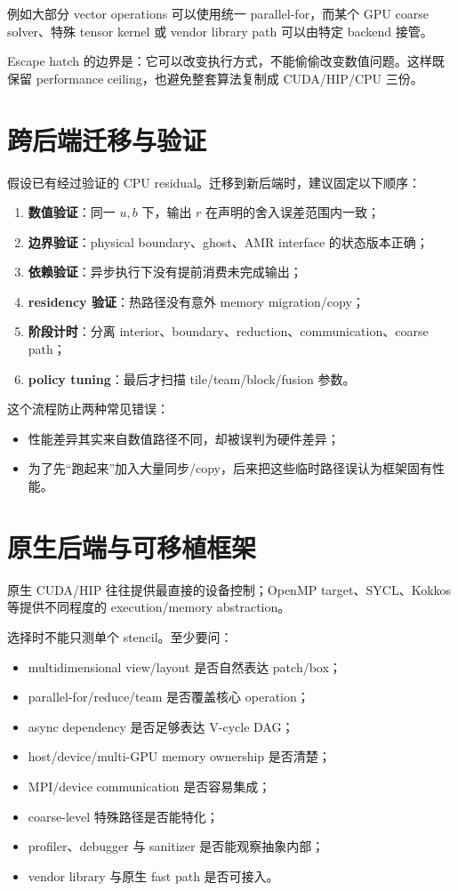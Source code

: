 例如大部分 vector operations 可以使用统一 parallel-for，而某个 GPU coarse solver、特殊 tensor kernel 或 vendor library path 可以由特定 backend 接管。

Escape hatch 的边界是：它可以改变执行方式，不能偷偷改变数值问题。这样既保留 performance ceiling，也避免整套算法复制成 CUDA/HIP/CPU 三份。

\section{跨后端迁移与验证}

假设已有经过验证的 CPU residual。迁移到新后端时，建议固定以下顺序：

\begin{enumerate}
\item \textbf{数值验证}：同一 $u,b$ 下，输出 $r$ 在声明的舍入误差范围内一致；
\item \textbf{边界验证}：physical boundary、ghost、AMR interface 的状态版本正确；
\item \textbf{依赖验证}：异步执行下没有提前消费未完成输出；
\item \textbf{residency 验证}：热路径没有意外 memory migration/copy；
\item \textbf{阶段计时}：分离 interior、boundary、reduction、communication、coarse path；
\item \textbf{policy tuning}：最后才扫描 tile/team/block/fusion 参数。
\end{enumerate}

这个流程防止两种常见错误：

\begin{itemize}
\item 性能差异其实来自数值路径不同，却被误判为硬件差异；
\item 为了先“跑起来”加入大量同步/copy，后来把这些临时路径误认为框架固有性能。
\end{itemize}

\section{原生后端与可移植框架}

原生 CUDA/HIP 往往提供最直接的设备控制；OpenMP target、SYCL、Kokkos 等提供不同程度的 execution/memory abstraction。

选择时不能只测单个 stencil。至少要问：

\begin{itemize}
\item multidimensional view/layout 是否自然表达 patch/box；
\item parallel-for/reduce/team 是否覆盖核心 operation；
\item async dependency 是否足够表达 V-cycle DAG；
\item host/device/multi-GPU memory ownership 是否清楚；
\item MPI/device communication 是否容易集成；
\item coarse-level 特殊路径是否能特化；
\item profiler、debugger 与 sanitizer 是否能观察抽象内部；
\item vendor library 与原生 fast path 是否可接入。
\end{itemize}

